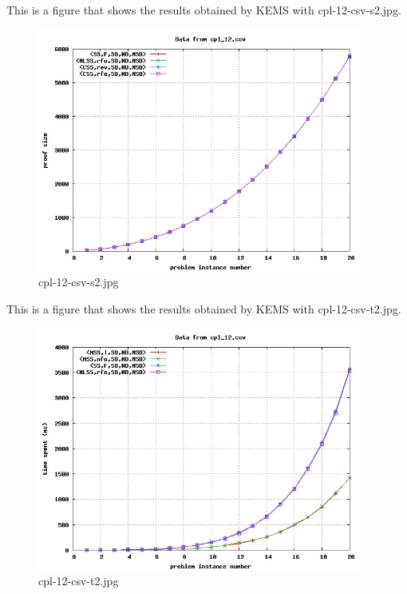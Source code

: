 This is a figure that shows the results obtained by KEMS with cpl-12-csv-s2.jpg.
\begin{figure}[htbp]
\begin{center}
\includegraphics[width=0.95\textwidth]{figuras/cpl-12-csv-s2.jpg}
\end{center}
\caption{cpl-12-csv-s2.jpg}
\end{figure}

This is a figure that shows the results obtained by KEMS with cpl-12-csv-t2.jpg.
\begin{figure}[htbp]
\begin{center}
\includegraphics[width=0.95\textwidth]{figuras/cpl-12-csv-t2.jpg}
\end{center}
\caption{cpl-12-csv-t2.jpg}
\end{figure}

